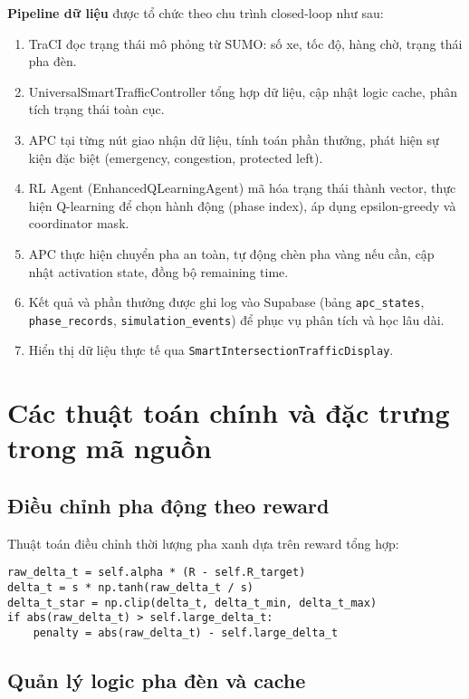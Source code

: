 \textbf{Pipeline dữ liệu} được tổ chức theo chu trình closed-loop như sau:
\begin{enumerate}
    \item TraCI đọc trạng thái mô phỏng từ SUMO: số xe, tốc độ, hàng chờ, trạng thái pha đèn.
    \item UniversalSmartTrafficController tổng hợp dữ liệu, cập nhật logic cache, phân tích trạng thái toàn cục.
    \item APC tại từng nút giao nhận dữ liệu, tính toán phần thưởng, phát hiện sự kiện đặc biệt (emergency, congestion, protected left).
    \item RL Agent (EnhancedQLearningAgent) mã hóa trạng thái thành vector, thực hiện Q-learning để chọn hành động (phase index), áp dụng epsilon-greedy và coordinator mask.
    \item APC thực hiện chuyển pha an toàn, tự động chèn pha vàng nếu cần, cập nhật activation state, đồng bộ remaining time.
    \item Kết quả và phần thưởng được ghi log vào Supabase (bảng \texttt{apc\_states}, \texttt{phase\_records}, \texttt{simulation\_events}) để phục vụ phân tích và học lâu dài.
    \item Hiển thị dữ liệu thực tế qua \texttt{SmartIntersectionTrafficDisplay}.
\end{enumerate}

\section{Các thuật toán chính và đặc trưng trong mã nguồn}

\subsection{Điều chỉnh pha động theo reward}

Thuật toán điều chỉnh thời lượng pha xanh dựa trên reward tổng hợp:
\begin{lstlisting}[style=py,caption={Thuật toán điều chỉnh delta-t}]
raw_delta_t = self.alpha * (R - self.R_target)
delta_t = s * np.tanh(raw_delta_t / s)
delta_t_star = np.clip(delta_t, delta_t_min, delta_t_max)
if abs(raw_delta_t) > self.large_delta_t:
    penalty = abs(raw_delta_t) - self.large_delta_t
\end{lstlisting}

\subsection{Quản lý logic pha đèn và cache}

